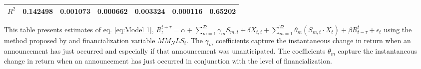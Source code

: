 \begin{sidewaystable}
{\begin{tabular}{@{}lllllllllllll@{}}
            \\ \textbf{$R^2$}             &\multicolumn{2}{c}{ 0.142498 }                                                 & \multicolumn{2}{c}{ 0.001073 }                                                 & \multicolumn{2}{c}{ 0.000662 }                                                 & \multicolumn{2}{c}{ 0.003324 }                                                 & \multicolumn{2}{c}{ 0.000116 }                                                   & \multicolumn{2}{c}{ 0.65202 }                                                 \\ \bottomrule 
\end{tabular}
}
\begin{tablenotes}\item 
    \singlespacing
    \footnotesize
    This table presents estimates of eq. \ref{eq:Model 1}, $R_{t}^{t+\tau}=\alpha+\sum_{m=1}^{22} \gamma_m S_{m,t}+ \delta X_{t,i} + \sum_{m=1}^{22} \theta_m (S_{m,t} \cdot X_t)+\beta R_{t-\tau}^{t}+\epsilon_{t}$ using the method proposed by \citet{andersen2007real} and financialization variable $MM_NLS_t$. The $\gamma_m$ coefficients capture the instantaneous change in return when an announcement has just occurred and especially if that announcement was unanticipated. The coefficients $\theta_m$ capture the instantaneous change in return when an announcement has just occurred in conjunction with the level of financialization.
\end{tablenotes}
\end{sidewaystable}



